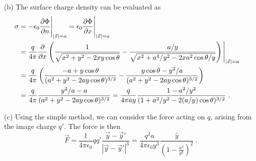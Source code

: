 \documentclass[12pt]{article}
\begin{document}
\newpage
\noindent(b) The surface charge density can be evaluated as
\begin{align}
    \sigma &= - \epsilon_0 \frac{\partial \Phi}{\partial n} \Bigg|_{|\vec x| = a}  = \epsilon_0 \frac{\partial \Phi}{\partial x} \Bigg|_{|\vec x| = a}\cr
    &= \frac{q}{4\pi} \frac{\partial}{\partial x} \left( \frac{1}{\sqrt{x^2 + y^2 - 2xy\cos \theta}} - \frac{a/y}{\sqrt{x^2 + a^4/y^2 - 2 x a^2 \cos \theta/y} } \right)\Bigg|_{|\vec x| = a}\cr
    &= \frac{q}{4\pi}\left( \frac{-a + y \cos\theta}{(a^2 + y^2 - 2ay\cos \theta)^{3/2}} - \frac{y\cos \theta -y^2/a}{(a^2 + y^2 - 2ay\cos \theta)^{3/2}} \right) \cr
    &= \frac{q}{4\pi} \frac{y^2/a-a}{(a^2 + y^2 - 2ay\cos \theta)^{3/2}} = \frac{q}{4\pi ay} \frac{1-a^2/y^2}{(1+ a^2/y^2 - 2(a/y)\cos \theta)^{3/2}}~.
\end{align}


\newpage
\noindent(c) Using the simple method, we can consider the force acting on $q$, arising from the image charge $q'$. The force is then
\begin{equation}
    \vec F = \frac{1}{4\pi \epsilon_0} q q' \frac{\vec y - \vec y'}{|\vec y - \vec y'|^3} = \frac{q^2 a}{4\pi \epsilon_0 y^3} \frac{\hat y}{\left(1- \frac{a^2}{y^2}\right)^2}~.
\end{equation}
\end{document}

